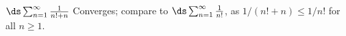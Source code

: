 {$\ds \sum_{n=1}^\infty \frac{1}{n!+n}$
}
{Converges; compare to $\ds \sum_{n=1}^\infty \frac{1}{n!}$, as $1/(n!+n) \leq 1/n!$ for all $n\geq 1$. 
}